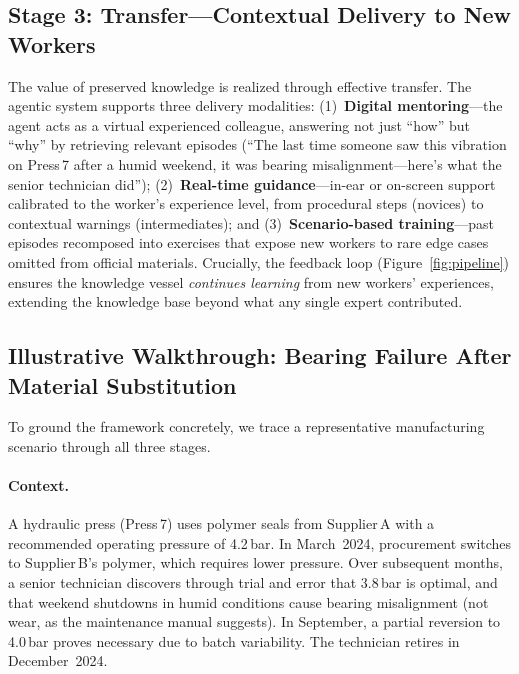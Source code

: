 \documentclass[]{ceurart}
\begin{document}
\subsection{Stage 3: Transfer---Contextual Delivery to New
  Workers}\label{sec:transfer}

The value of preserved knowledge is realized through effective transfer.
The agentic system supports three delivery modalities:
(1)~\textbf{Digital mentoring}---the agent acts as a virtual experienced
colleague, answering not just ``how'' but ``why'' by retrieving relevant
episodes (``The last time someone saw this vibration on Press\,7 after a
humid weekend, it was bearing misalignment---here's what the senior
technician did'');
(2)~\textbf{Real-time guidance}---in-ear or on-screen support calibrated
to the worker's experience level, from procedural steps (novices) to
contextual warnings (intermediates); and
(3)~\textbf{Scenario-based training}---past episodes recomposed into
exercises that expose new workers to rare edge cases omitted from
official materials. Crucially, the feedback loop
(Figure~\ref{fig:pipeline}) ensures the knowledge vessel \emph{continues
learning} from new workers' experiences, extending the knowledge base
beyond what any single expert contributed.

\subsection{Illustrative Walkthrough: Bearing Failure After Material
  Substitution}\label{sec:walkthrough}

To ground the framework concretely, we trace a representative
manufacturing scenario through all three stages.

\paragraph{Context.} A hydraulic press (Press\,7) uses polymer seals
from Supplier\,A with a recommended operating pressure of 4.2\,bar. In
March~2024, procurement switches to Supplier\,B's polymer, which
requires lower pressure. Over subsequent months, a senior technician
discovers through trial and error that 3.8\,bar is optimal, and that
weekend shutdowns in humid conditions cause bearing misalignment (not
wear, as the maintenance manual suggests). In September, a partial
reversion to 4.0\,bar proves necessary due to batch variability. The
technician retires in December~2024.
\end{document}
